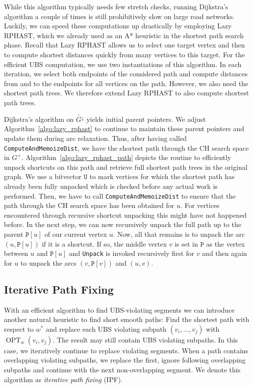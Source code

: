 \documentclass[a4paper,UKenglish,cleveref, autoref, thm-restate]{lipics-v2021}
\newcommand*{\shp}{\operatorname{OPT}}
\newcommand*{\gchd}{\overleftarrow{G^{\downarrow}}}
\begin{document}
While this algorithm typically needs few stretch checks, running Dijkstra's algorithm a couple of times is still prohibitively slow on large road networks.
Luckily, we can speed these computations up drastically by employing Lazy RPHAST, which we already used as an A* heuristic in the shortest path search phase.
Recall that Lazy RPHAST allows us to select one target vertex and then to compute shortest distances quickly from many vertices to this target.
For the efficient UBS computation, we use two instantiations of this algorithm.
In each iteration, we select both endpoints of the considered path and compute distances from and to the endpoints for all vertices on the path.
However, we also need the shortest path trees.
We therefore extend Lazy RPHAST to also compute shortest path trees.

Dijkstra's algorithm on $\gchd$ yields initial parent pointers.
We adjust Algorithm~\ref{algo:lazy_rphast} to continue to maintain these parent pointers and update them during arc relaxation.
Thus, after having called \texttt{ComputeAndMemoizeDist}, we have the shortest path through the CH search space in $G^+$.
Algorithm~\ref{algo:lazy_rphast_path} depicts the routine to efficiently unpack shortcuts on this path and retrieve full shortest path trees in the original graph.
We use a bitvector $\mathtt{U}$ to mark vertices for which the shortest path has already been fully unpacked which is checked before any actual work is performed.
Then, we have to call \texttt{ComputeAndMemoizeDist} to ensure that the path through the CH search space has been obtained for $u$.
For vertices encountered through recursive shortcut unpacking this might have not happened before.
In the next step, we can now recursively unpack the full path up to the parent $\mathtt{P}[u]$ of our current vertex $u$.
Now, all that remains is to unpack the arc $(u, \mathtt{P}[u])$ if it is a shortcut.
If so, the middle vertex $v$ is set in $\mathtt{P}$ as the vertex between $u$ and $\mathtt{P}[u]$ and \texttt{Unpack} is invoked recursively first for $v$ and then again for $u$ to unpack the arcs $(v, \mathtt{P}[v])$ and $(u,v)$.

\subsection{Iterative Path Fixing}

With an efficient algorithm to find UBS-violating segments we can introduce another natural heuristic to find short smooth paths:
Find the shortest path with respect to $w^*$ and replace each UBS violating subpath $(v_i,\dots,v_j)$ with $\shp_w(v_i, v_j)$.
The result may still contain UBS violating subpaths.
In this case, we iteratively continue to replace violating segments.
When a path contains overlapping violating subpaths, we replace the first, ignore following overlapping subpaths and continue with the next non-overlapping segment.
We denote this algorithm as \emph{iterative path fixing} (IPF).
\end{document}
